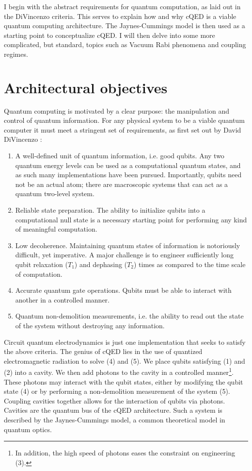 \documentclass[11 pt, oneside]{book} %
\begin{document}
I begin with the abstract requirements for quantum computation, as laid out in the DiVincenzo criteria. This serves to explain how and why cQED is a viable quantum computing architecture. The Jaynes-Cummings model is then used as a starting point to conceptualize cQED. I will then delve into some more complicated, but standard, topics such as Vacuum Rabi phenomena and coupling regimes.

\section{Architectural objectives}\label{sec:DiVincenzo}
Quantum computing is motivated by a clear purpose: the manipulation and control of quantum information. For any physical system to be a viable quantum computer it must meet a stringent set of requirements, as first set out by David DiVincenzo \cite{DiVincenzo}:

\begin{enumerate}
\item A well-defined unit of quantum information, i.e. good qubits. Any two quantum energy levels can be used as a computational quantum states, and as such many implementations have been pursued. Importantly, qubits need not be an actual atom; there are macroscopic systems that can act as a quantum two-level system. 
\item Reliable state preparation. The ability to initialize qubits into a computational null state is a necessary starting point for performing any kind of meaningful computation.
\item Low decoherence. Maintaining quantum states of information is notoriously difficult, yet imperative.  A major challenge is to engineer sufficiently long qubit relaxation ($T_1$) and dephasing ($T_2$) times as compared to the time scale of computation. 
\item Accurate quantum gate operations. Qubits must be able to interact with another in a controlled manner. 
\item Quantum non-demolition  measurements, i.e. the ability to read out the state of the system without destroying any information. 
\end{enumerate}

Circuit quantum electrodynamics is just one implementation that seeks to satisfy the above criteria. The genius of cQED lies in the use of quantized electromagnetic radiation to solve (4) and (5). We place qubits satisfying (1) and (2) into a cavity. We then add photons to the cavity in a controlled manner\footnote{In addition, the high speed of photons eases the constraint on engineering (3).}. These photons may interact with the qubit states, either by modifying the qubit state (4) or by performing a non-demolition measurement of the system (5). Coupling cavities together allows for the interaction of qubits via photons. Cavities are the quantum bus of the cQED architecture. Such a system is described by the Jaynes-Cummings model, a common theoretical model in quantum optics. 
\end{document}
